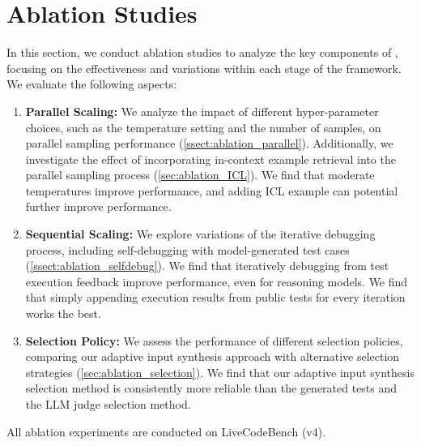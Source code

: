\section{Ablation Studies}
\label{sec:ablations}
In this section, we conduct ablation studies to analyze the key components of \frameworkname, focusing on the effectiveness and variations within each stage of the framework. We evaluate the following aspects:
\begin{enumerate}
\item \textbf{Parallel Scaling:} We analyze the impact of different hyper-parameter choices, such as the temperature setting and the number of samples, on parallel sampling performance (\cref{ssect:ablation_parallel}). Additionally, we investigate the effect of incorporating in-context example retrieval into the parallel sampling process (\cref{sec:ablation_ICL}). We find that moderate temperatures improve performance, and adding ICL example can potential further improve performance.
\item \textbf{Sequential Scaling:} We explore variations of the iterative debugging process, including self-debugging with model-generated test cases (\cref{ssect:ablation_selfdebug}). We find that iteratively debugging from test execution feedback improve performance, even for reasoning models. We find that simply appending execution results from public tests for every iteration works the best.
\item \textbf{Selection Policy:} We assess the performance of different selection policies, comparing our adaptive input synthesis approach with alternative selection strategies (\cref{sec:ablation_selection}). We find that our adaptive input synthesis selection method is consistently more reliable than the generated tests and the LLM judge selection method.
\end{enumerate}
All ablation experiments are conducted on LiveCodeBench (v4).

